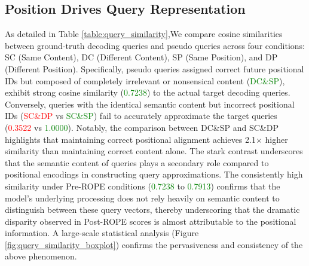 \subsection{Position Drives Query Representation}
As detailed in Table \ref{table:query_similarity},We compare cosine similarities between ground-truth decoding queries and pseudo queries across four conditions: SC (Same Content), DC (Different Content), SP (Same Position), and DP (Different Position). Specifically, pseudo queries assigned correct future positional IDs but composed of completely irrelevant or nonsensical content (\textcolor{green}{DC\&SP}), exhibit strong cosine similarity (\textcolor{green}{0.7238}) to the actual target decoding queries. Conversely, queries with the identical semantic content but incorrect positional IDs (\textcolor{red}{SC\&DP} vs \textcolor{green}{SC\&SP}) fail to accurately approximate the target queries (\textcolor{red}{0.3522} vs \textcolor{green}{1.0000}). Notably, the comparison between DC\&SP and SC\&DP highlights that maintaining correct positional alignment achieves 2.1× higher similarity than maintaining correct content alone. The stark contrast underscores that the semantic content of queries plays a secondary role compared to positional encodings in constructing query approximations. The consistently high similarity under Pre-ROPE conditions (\textcolor{green}{0.7238} to \textcolor{green}{0.7913}) confirms that the model's underlying processing does not rely heavily on semantic content to distinguish between these query vectors, thereby underscoring that the dramatic disparity observed in Post-ROPE scores is almost attributable to the positional information. A large-scale statistical analysis (Figure \ref{fig:query_similarity_boxplot}) confirms the pervasiveness and consistency of the above phenomenon. 


